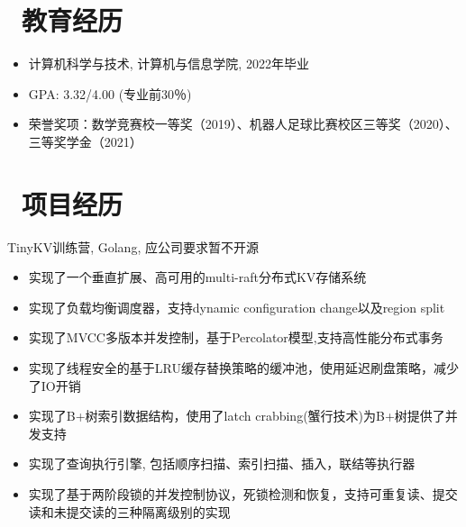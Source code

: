 \documentclass{resume}
\begin{document}


  
\section{\faGraduationCap\ 教育经历}
\begin{itemize}
    \item 计算机科学与技术, 计算机与信息学院, 2022年毕业
    \item GPA: 3.32/4.00  (专业前30％)
    \item 荣誉奖项：数学竞赛校一等奖（2019）、机器人足球比赛校区三等奖（2020）、三等奖学金（2021）
\end{itemize}
\section{\faUsers\ 项目经历}
TinyKV训练营, Golang, 应公司要求暂不开源
\begin{itemize}
  \item 实现了一个垂直扩展、高可用的multi-raft分布式KV存储系统
  \item 实现了负载均衡调度器，支持dynamic configuration change以及region split
  \item 实现了MVCC多版本并发控制，基于Percolator模型,支持高性能分布式事务
\end{itemize}

\begin{onehalfspacing}
\begin{itemize}
  \item 实现了线程安全的基于LRU缓存替换策略的缓冲池，使用延迟刷盘策略，减少了IO开销
  \item 实现了B+树索引数据结构，使用了latch crabbing(蟹行技术)为B+树提供了并发支持
  \item 实现了查询执行引擎, 包括顺序扫描、索引扫描、插入，联结等执行器
  \item 实现了基于两阶段锁的并发控制协议，死锁检测和恢复，支持可重复读、提交读和未提交读的三种隔离级别的实现
\end{itemize}
\end{onehalfspacing}
\end{document}
